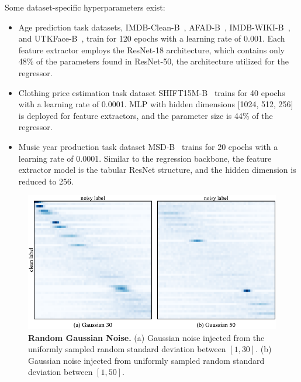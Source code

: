 \documentclass{article}
\theoremstyle{plain}
\theoremstyle{definition}
\theoremstyle{remark}
\begin{document}
Some dataset-specific hyperparameters exist:
\begin{itemize}
    \item Age prediction task datasets, IMDB-Clean-B~\citep{lin2021imdbclean}, AFAD-B~\citep{niu16afad}, IMDB-WIKI-B~\citep{rothe18imdb}, and UTKFace-B~\citep{zhifei2017utkface}, train for 120 epochs
    with a learning rate of 0.001. 
    Each feature extractor employs the ResNet-18 architecture, which contains only 48\% of the parameters found in ResNet-50, the architecture utilized for the regressor.
    \item Clothing price estimation task dataset SHIFT15M-B~\citep{kimura21shift15m} trains for 40 epochs
    with a learning rate of 0.0001.
    MLP with hidden dimensions [1024, 512, 256] is deployed for feature extractors, and the parameter size is 44\% of the regressor.
    \item Music year production task dataset MSD-B~\citep{bertin11msd} trains for 20 epochs
    with a learning rate of 0.0001. 
    Similar to the regression backbone, the feature extractor model is the tabular ResNet structure\citep{gorishniy21nips}, and the hidden dimension is reduced to 256.
\end{itemize}

\begin{figure}[t]
\begin{center}
\centerline{\includegraphics[width=0.8\columnwidth]{imgs/gaussian_noise_depict.pdf}}
\caption{\textbf{Random Gaussian Noise.} (a) Gaussian noise injected from the uniformly sampled random standard deviation between $[1,30]$. 
(b) Gaussian noise injected from uniformly sampled random standard deviation between $[1,50]$.}
\label{fig:gaussian_depict}
\end{center}
\end{figure}
\end{document}
